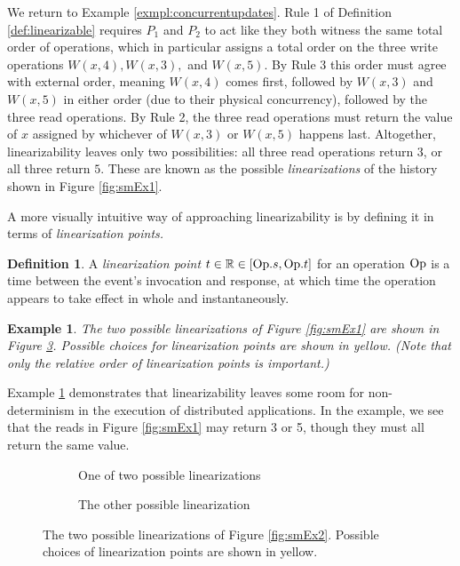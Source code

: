 \documentclass[]             %
{NASA}                       %
\newtheorem{example}{Example}
\theoremstyle{definition}
\newtheorem{definition}{Definition}[section]
\begin{document}
We return to Example \ref{exmpl:concurrentupdates}. Rule 1 of
Definition \ref{def:linearizable} requires $P_1$ and $P_2$ to act like
they both witness the same total order of operations, which in
particular assigns a total order on the three write operations
$W(x,4), W(x,3),$ and $W(x,5)$. By Rule 3 this order must agree with
external order, meaning $W(x,4)$ comes first, followed by $W(x,3)$ and
$W(x,5)$ in either order (due to their physical concurrency), followed
by the three read operations. By Rule 2, the three read operations
must return the value of $x$ assigned by whichever of $W(x,3)$ or
$W(x,5)$ happens last. Altogether, linearizability leaves only two
possibilities: all three read operations return $3$, or all three
return $5$. These are known as the possible \emph{linearizations} of
the history shown in Figure \ref{fig:smEx1}.

A more visually intuitive way of approaching linearizability is by
defining it in terms of \emph{linearization points.}

\begin{definition}
  A \emph{linearization point} $t \in \mathbb{R} \in [\mathrm{Op}.s, \mathrm{Op}.t]$
  for an operation $\mathrm{Op}$ is a time between the event's invocation and
  response, at which time the operation appears to take effect in
  whole and instantaneously.
\end{definition}

\begin{example}
  \label{exmpl:linearizations}
  The two possible linearizations of Figure \ref{fig:smEx1} are shown
  in Figure \ref{fig:smEx3}. Possible choices for linearization points
  are shown in yellow. (Note that only the relative order of
  linearization points is important.)
\end{example}

Example \ref{exmpl:linearizations} demonstrates that linearizability
leaves some room for non-determinism in the execution of distributed
applications. In the example, we see that the reads in Figure
\ref{fig:smEx1} may return 3 or 5, though they must all return the
same value.
\begin{figure}[p]
  \setlength\belowcaptionskip{5ex}

  \begin{subfigure}{1\textwidth}
    \centering
    
    \caption{One of two possible linearizations}
    \label{fig:smEx1L1}
  \end{subfigure}

  \begin{subfigure}{1\textwidth}
    
    \caption{The other possible linearization}
    \label{fig:smEx3L2}
  \end{subfigure}

  \caption{The two possible linearizations of Figure \ref{fig:smEx2}. Possible choices of linearization points are shown in yellow.}
  \label{fig:smEx3}
\end{figure}
\afterpage{\clearpage}
\end{document}
